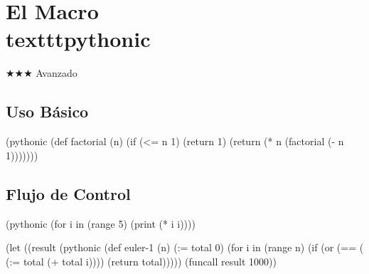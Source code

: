 \chapter{El Macro \\texttt{pythonic}}
\label{chap:pythonic}
{\huge$\bigstar$}{\huge$\bigstar$}{\huge$\bigstar$} Avanzado

\section{Uso Básico}
\begin{lispcode}
(pythonic (def factorial (n)
            (if (<= n 1) (return 1)
              (return (* n (factorial (- n 1)))))))
\end{lispcode}

\section{Flujo de Control}
\begin{lispcode}
(pythonic (for i in (range 5) (print (* i i))))
\end{lispcode}

\begin{examplebox}[title=Project Euler \\ \#1 con pythonic]
\begin{lispcode}
(let ((result (pythonic
                (def euler-1 (n)
                  (:= total 0)
                  (for i in (range n)
                    (if (or (== (%
                      (:= total (+ total i))))
                  (return total)))))
  (funcall result 1000))
\end{lispcode}
\end{examplebox}

